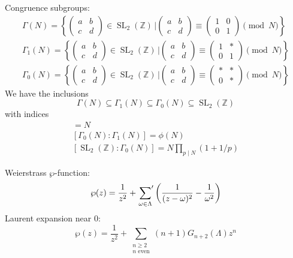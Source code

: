 \documentclass[11pt]{article}
\newcommand{\bZ}{\mathbb{Z}}
\DeclareMathOperator{\SL}{SL}
\newcommand{\SLZ}{\SL_2(\bZ)}
\begin{document}
\noindent Congruence subgroups:
\begin{gather*}
    \Gamma(N) = \left\{ \begin{pmatrix} a&b\\c&d \end{pmatrix} \in \SLZ \,\bigg\vert \begin{pmatrix} a&b\\c&d \end{pmatrix} \equiv \begin{pmatrix} 1&0\\0&1 \end{pmatrix} \pmod{N} \right\}\\
    \Gamma_1(N) = \left\{ \begin{pmatrix} a&b\\c&d \end{pmatrix} \in \SLZ \,\bigg\vert \begin{pmatrix} a&b\\c&d \end{pmatrix} \equiv \begin{pmatrix} 1&*\\0&1 \end{pmatrix} \pmod{N} \right\}\\
    \Gamma_0(N) = \left\{ \begin{pmatrix} a&b\\c&d \end{pmatrix} \in \SLZ \,\bigg\vert \begin{pmatrix} a&b\\c&d \end{pmatrix} \equiv \begin{pmatrix} *&*\\0&* \end{pmatrix} \pmod{N} \right\}
\end{gather*}
We have the inclusions
\begin{equation*}
    \Gamma(N) \subseteq \Gamma_1(N) \subseteq \Gamma_0(N) \subseteq \SLZ
\end{equation*}
with indices
\begin{gather*}
    [\Gamma_1(N) : \Gamma(N)] = N\\
    [\Gamma_0(N) : \Gamma_1(N)] = \phi(N)\\
    [\SLZ : \Gamma_0(N)] = N \prod_{p \mid N} (1 + 1/p)
\end{gather*}

\noindent Weierstrass $\wp$-function:
\begin{equation*}
    \wp(z) = \frac{1}{z^2} + \sideset{}{'}\sum_{\omega \in \Lambda} \left(\frac{1}{(z-\omega)^2} - \frac{1}{\omega^2}\right)
\end{equation*}
Laurent expansion near $0$:
\begin{equation*}
    \wp(z) = \frac{1}{z^2} + \sum_{\substack{n \ge 2 \\ n \text{ even}}} (n + 1) G_{n+2}(\Lambda) z^n
\end{equation*}

\nocite{*}
\printbibliography
\end{document}

